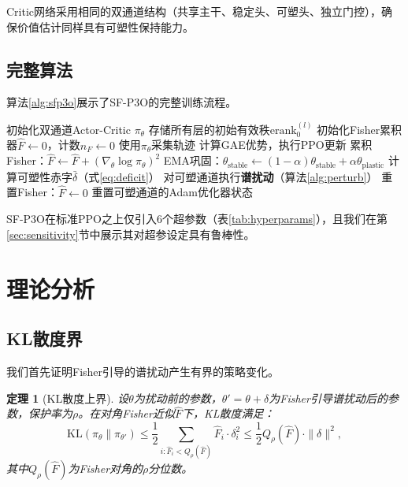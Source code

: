 \documentclass[twocolumn]{article}
\newtheorem{theorem}{\bf 定理}
\newcommand{\erank}{\mathrm{erank}}
\newcommand{\KL}{\mathrm{KL}}
\begin{document}
Critic网络采用相同的双通道结构（共享主干、稳定头、可塑头、独立门控），确保价值估计同样具有可塑性保持能力。


\subsection{完整算法}
\label{sec:full_algo}

算法\ref{alg:sfp3o}展示了SF-P3O的完整训练流程。

\begin{algorithm}[H]
\caption{SF-P3O完整算法}
\label{alg:sfp3o}
\begin{algorithmic}[1]
\STATE 初始化双通道Actor-Critic $\pi_\theta$
\STATE 存储所有层的初始有效秩$\erank_0^{(l)}$
\STATE 初始化Fisher累积器$\hat{F} \leftarrow 0$，计数$n_F \leftarrow 0$
    \STATE 使用$\pi_\theta$采集轨迹
    \STATE 计算GAE优势，执行PPO更新
    \STATE 累积Fisher：$\hat{F} \leftarrow \hat{F} + (\nabla_\theta \log \pi_\theta)^2$
    \STATE EMA巩固：$\theta_{\text{stable}} \!\leftarrow\! (1{-}\alpha)\theta_{\text{stable}} {+} \alpha\theta_{\text{plastic}}$
        \STATE 计算可塑性赤字$\bar{\delta}$（式\ref{eq:deficit}）
            \STATE 对可塑通道执行\textbf{谱扰动}（算法\ref{alg:perturb}）
            \STATE 重置Fisher：$\hat{F} \leftarrow 0$
            \STATE 重置可塑通道的Adam优化器状态
        \ENDIF
    \ENDIF
\ENDFOR
\end{algorithmic}
\end{algorithm}

SF-P3O在标准PPO之上仅引入6个超参数（表\ref{tab:hyperparams}），且我们在第\ref{sec:sensitivity}节中展示其对超参设定具有鲁棒性。


\section{理论分析}
\label{sec:theory}

\subsection{KL散度界}

我们首先证明Fisher引导的谱扰动产生有界的策略变化。

\begin{theorem}[KL散度上界]
\label{thm:kl_bound}
设$\theta$为扰动前的参数，$\theta' = \theta + \delta$为Fisher引导谱扰动后的参数，保护率为$\rho$。在对角Fisher近似$\hat{F}$下，KL散度满足：
\begin{equation}
    \KL(\pi_\theta \| \pi_{\theta'}) \leq \frac{1}{2} \sum_{i:\hat{F}_i < Q_\rho(\hat{F})} \hat{F}_i \cdot \delta_i^2 \leq \frac{1}{2} Q_\rho(\hat{F}) \cdot \|\delta\|^2,
\end{equation}
其中$Q_\rho(\hat{F})$为Fisher对角的$\rho$分位数。
\end{theorem}
\end{document}
